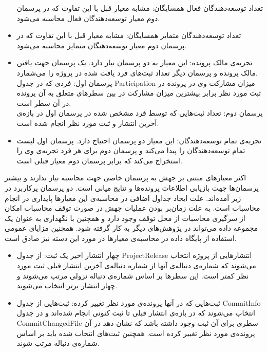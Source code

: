 \begin{itemize}
تعداد توسعه‌دهندگان فعال همسایگان: مشابه معیار قبل با این تفاوت که در پرسمان دوم معیار توسعه‌دهندگان فعال محاسبه می‌شود.
\item
تعداد توسعه‌دهندگان متمایز همسایگان: مشابه معیار قبل با این تفاوت که در پرسمان دوم معیار توسعه‌دهنگان متمایز محاسبه می‌شود.
\item
تجربه‌ی مالک پرونده: این معیار به دو پرسمان نیاز دارد. یک پرسمان جهت یافتن مالک پرونده و پرسمان دیگر تعداد ثبت‌های فرد یافت شده در پروژه را می‌شمارد. \\
پرسمان اول: فردی که در جدول Participation میزان مشارکت وی در پرونده در ثبت مورد نظر برابر بیشترین میزان مشارکت در بین سطرهای متعلق به آن پرونده در آن سطر است.\\
پرسمان دوم: تعداد ثبت‌هایی که توسط فرد مشخص شده در پرسمان اول در بازه‌ی آخرین انتشار و  ثبت مورد نظر انجام شده است. 
\item
تجربه‌ی تمام توسعه‌دهندگان: این معیار دو پرسمان احتیاج دارد. پرسمان اول لیست تمام توسعه‌دهندگان را پیدا می‌کند و پرسمان دوم برای هر فرد تجربه‌ی وی را استخراج می‌کند که برابر پرسمان دوم معیار قبلی است. 

\end{itemize}
 
اکثر معیارهای مبتنی بر جهش به پرسمان خاصی جهت محاسبه نیاز ندارند و بیشتر پرسمان‌ها جهت بازیابی اطلاعات پرونده‌ها و نتایج میانی است. دو پرسمان پرکاربرد در زیر آمده‌اند. علت ایجاد جداول اضافی در محاسبه‌ی  این معیارها پایداری در انجام محاسبات است.  به علت زمان‌بر بودن عملیات جهش  در صورت توقف محاسبات امکان از سرگیری محاسبات از محل توقف وجود  دارد و همچنین  با نگهداری به عنوان یک مجموعه داده می‌تواند در پژوهش‌های دیگر به کار گرفته شود. همچنین مزایای عمومی استفاده از پایگاه داده در محاسبه‌ی معیارها در مورد این دسته نیز صادق است. 

\begin{itemize}
\item
	 چهار انتشار اخیر یک ثبت: از جدول ProjectRelease انتشارهایی از پروژه انتخاب می‌شوند که شماره‌ی دنباله‌ی آنها از شماره‌ دنباله‌ی  آخرین انتشار قبلی ثبت مورد نظر کمتر است. این سطر‌ها بر اساس  شماره‌ی دنباله نزولی مرتب می‌شوند و چهار انتشار برتر انتخاب می‌شوند. 
\item
ثبت‌هایی که در آنها پرونده‌ی مورد نظر تغییر کرده: ثبت‌هایی از جدول CommitInfo انتخاب می‌شوند که در بازه‌ی انتشار قبلی تا ثبت کنونی انجام شده‌اند و در جدول CommitChangedFile سطری برای آن ثبت وجود داشته باشد که نشان دهد در آن پرونده‌ی مورد نظر تغییر کرده است. همچنین ثبت‌های انتخاب شده باید بر اساس شماره‌ی دنباله مرتب شوند. 
	 
\end{itemize}

